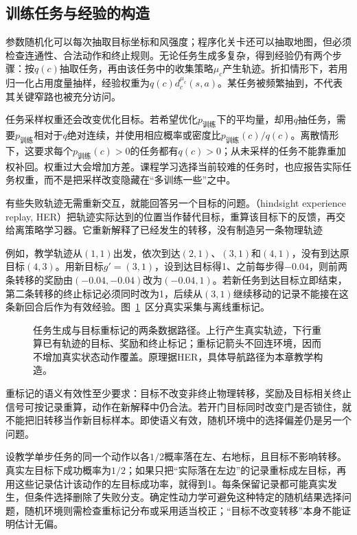 \subsection{训练任务与经验的构造}
\label{sec:rl-transfer-data}

参数随机化可以每次抽取目标坐标和风强度；程序化关卡还可以抽取地图，但必须检查连通性、合法动作和终止规则。无论任务生成多复杂，得到经验仍有两个步骤：按$q(c)$抽取任务，再由该任务中的收集策略$\mu_c$产生轨迹。折扣情形下，若用归一化占用度量抽样，经验权重为$q(c)d_c^{\mu_c}(s,a)$。某任务被频繁抽到，不代表其关键窄路也被充分访问。

任务采样权重还会改变优化目标。若希望优化$p_{\text{训练}}$下的平均量，却用$q$抽任务，需要$p_{\text{训练}}$相对于$q$绝对连续，并使用相应概率或密度比$p_{\text{训练}}(c)/q(c)$。离散情形下，这要求每个$p_{\text{训练}}(c)>0$的任务都有$q(c)>0$；从未采样的任务不能靠重加权补回。权重过大会增加方差。课程学习选择当前较难的任务时，也应报告实际任务权重，而不是把采样改变隐藏在“多训练一些”之中。

有些失败轨迹无需重新交互，就能回答另一个目标的问题。（hindsight experience replay, HER）把轨迹实际达到的位置当作替代目标，重算该目标下的反馈，再交给离策略学习器。它重新解释了已经发生的转移，没有制造另一条物理轨迹

例如，教学轨迹从$(1,1)$出发，依次到达$(2,1)$、$(3,1)$和$(4,1)$，没有到达原目标$(4,3)$。用新目标$g'=(3,1)$，设到达目标得1、之前每步得$-0.04$，则前两条转移的奖励由$(-0.04,-0.04)$改为$(-0.04,1)$。若新任务到达目标立即结束，第二条转移的终止标记必须同时改为1，后续从$(3,1)$继续移动的记录不能接在这条新回合后作为有效经验。图~\ref{fig:rl-transfer-relabel}~区分真实采集与离线重标记。

\begin{figure}[htbp]
  \centering
  
  \caption{任务生成与目标重标记的两条数据路径。上行产生真实轨迹，下行重算已有轨迹的目标、奖励和终止标记；重标记箭头不回连环境，因而不增加真实状态动作覆盖。原理据HER，具体导航路径为本章教学构造。}
  \label{fig:rl-transfer-relabel}
\end{figure}

重标记的语义有效性至少要求：目标不改变非终止物理转移，奖励及目标相关终止信号可按记录重算，动作在新解释中仍合法。若开门目标同时改变门是否锁住，就不能把旧转移当作新目标样本。即使语义有效，随机环境中的选择偏差仍是另一个问题。

设教学单步任务的同一个动作以各$1/2$概率落在左、右地标，且目标不影响转移。真实左目标下成功概率为$1/2$；如果只把“实际落在左边”的记录重标成左目标，再用这些记录估计该动作的左目标成功率，就得到1。每条保留记录都可能真实发生，但条件选择删除了失败分支。确定性动力学可避免这种特定的随机结果选择问题，随机环境则需检查重标记分布或采用适当校正；“目标不改变转移”本身不能证明估计无偏。

